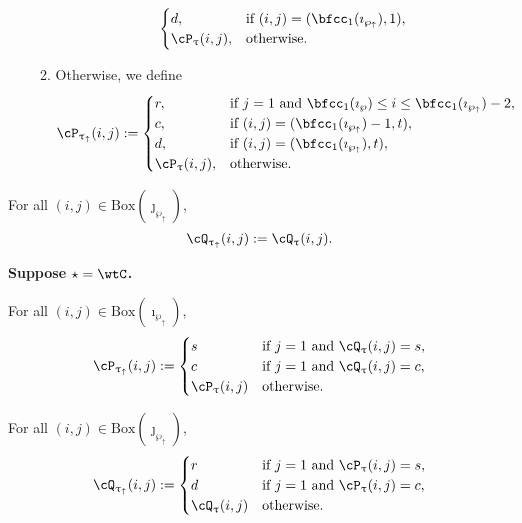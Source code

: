 \documentclass[12pt,a4paper]{amsart}
\def\ttau{\tilde{\tau}}
\def\wpu{\wp_{\uparrow}}
\def\wpd{\wp} %
\def\uptauu{\uptau_{\uparrow}}
\def\uptaud{\uptau} %
\def\PPm{\wp_{\downarrow}}
\def\uptaum{\uptau_{\downarrow}}
\numberwithin{equation}{section}
\theoremstyle{remark}
\newcommand{\BOX}[1]{\mathrm{Box}(#1)}
\def\PBP{\mathsf{PBP}}
\def\PBPs{\mathsf{PBP}_{\star}}
\begin{document}
\begin{enumerate}[label=(\alph*)]
\begin{enumerate}[label={\localtextbulletone}]
\[\begin{cases}
         d ,& \text{if $(i,j)=(\bfcc_{1}(\imath_{\wpu}),1)$},\\
         \cP_{\uptaud}(i,j) ,&\text{otherwise}.
       \end{cases}
     \]
     \item Otherwise, we define
     \[
       \cP_{\uptauu}(i,j) := \begin{cases}
         r ,& \text{if $j=1$ and $\bfcc_{1}(\imath_{\wpd})\leq i \leq \bfcc_{1}(\imath_{\wpu})-2$},\\
         c ,& \text{if $(i,j)=(\bfcc_{1}(\imath_{\wpu})-1,t)$},\\
         d ,& \text{if $(i,j)=(\bfcc_{1}(\imath_{\wpu}),t)$},\\
         \cP_{\uptaud}(i,j) ,&\text{otherwise}.
       \end{cases}
     \]
   \end{enumerate}
 \end{enumerate}

  For all $(i,j)\in \BOX{\jmath_{\wpu}}$,
   \[
     \cQ_{\uptauu}(i,j) := \cQ_{\uptau}(i,j).
   \]

{\bfseries Suppose $\star = \wtC$.}

  For all $(i,j)\in \BOX{\imath_{\wpu}}$,
  \begin{equation} \label{eq:T.M1}
     \cP_{\uptauu}(i,j) :=
     \begin{cases}
       s& \text{if $j=1$ and  $\cQ_{\uptau}(i,j)=s$,}\\
       c& \text{if $j=1$ and  $\cQ_{\uptau}(i,j)=c$,}\\
       \cP_{\uptau}(i,j) &\text{otherwise.}
     \end{cases}
   \end{equation}

  For all $(i,j)\in \BOX{\jmath_{\wpu}}$,
  \begin{equation} \label{eq:T.M2}
    \cQ_{\uptauu}(i,j) :=
    \begin{cases}
      r& \text{if $j=1$ and  $\cP_{\uptau}(i,j)=s$,}\\
      d& \text{if $j=1$ and  $\cP_{\uptau}(i,j)=c$,}\\
      \cQ_{\uptau}(i,j) &\text{otherwise.}
    \end{cases}
  \end{equation}


\end{document}
